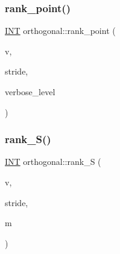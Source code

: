 \mbox{\label{classorthogonal_adb4f1528590a804b3c011a68c9ebf655}} 
\subsubsection{\texorpdfstring{rank\+\_\+point()}{rank\_point()}}
{\footnotesize\ttfamily \mbox{\hyperlink{galois_8h_a09fddde158a3a20bd2dcadb609de11dc}{I\+NT}} orthogonal\+::rank\+\_\+point (\begin{DoxyParamCaption}\item[{\mbox{\hyperlink{galois_8h_a09fddde158a3a20bd2dcadb609de11dc}{I\+NT}} $\ast$}]{v,  }\item[{\mbox{\hyperlink{galois_8h_a09fddde158a3a20bd2dcadb609de11dc}{I\+NT}}}]{stride,  }\item[{\mbox{\hyperlink{galois_8h_a09fddde158a3a20bd2dcadb609de11dc}{I\+NT}}}]{verbose\+\_\+level }\end{DoxyParamCaption})}

\mbox{\label{classorthogonal_a0dd6cea287b5f98d81bc87b1c42b1e1d}} 
\subsubsection{\texorpdfstring{rank\+\_\+\+S()}{rank\_S()}}
{\footnotesize\ttfamily \mbox{\hyperlink{galois_8h_a09fddde158a3a20bd2dcadb609de11dc}{I\+NT}} orthogonal\+::rank\+\_\+S (\begin{DoxyParamCaption}\item[{\mbox{\hyperlink{galois_8h_a09fddde158a3a20bd2dcadb609de11dc}{I\+NT}} $\ast$}]{v,  }\item[{\mbox{\hyperlink{galois_8h_a09fddde158a3a20bd2dcadb609de11dc}{I\+NT}}}]{stride,  }\item[{\mbox{\hyperlink{galois_8h_a09fddde158a3a20bd2dcadb609de11dc}{I\+NT}}}]{m }\end{DoxyParamCaption})}

\mbox{\label{classorthogonal_aea0a2cc174275eea357b9a68f277e970}} 
